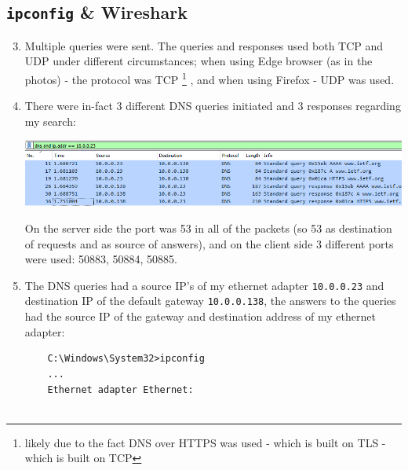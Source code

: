 \subsection{\texttt{ipconfig} \& Wireshark}
\begin{enumerate}[label=\textbf{\alph*.}]
    \setcounter{enumi}{2}
    \item Multiple queries were sent. The queries and responses used both TCP and UDP under different circumstances;
    when using Edge browser (as in the photos) - the protocol was TCP
    \footnote{likely due to the fact DNS over HTTPS was used - which is built on TLS - which is built on TCP}
    , and when using Firefox - UDP was used.
    \item There were in-fact 3 different DNS queries initiated and 3 responses regarding my search:
    \begin{center}
		\includegraphics[width=1.2 \textwidth]{resources/dns1.png}\centering
	\end{center}
    On the server side the port was 53 in all of the packets (so 53 as destination of requests
    and as source of answers), and on the client side 3 different ports were used: 50883, 50884, 50885.
    \item The DNS queries had a source IP's of my ethernet adapter \texttt{10.0.0.23} and destination IP
    of the default gateway \texttt{10.0.0.138}, the answers to the queries had the source IP of the
    gateway and destination address of my ethernet adapter:
    \begin{verbatim}
    C:\Windows\System32>ipconfig
    ...
    Ethernet adapter Ethernet:


\end{verbatim}
\end{enumerate}
